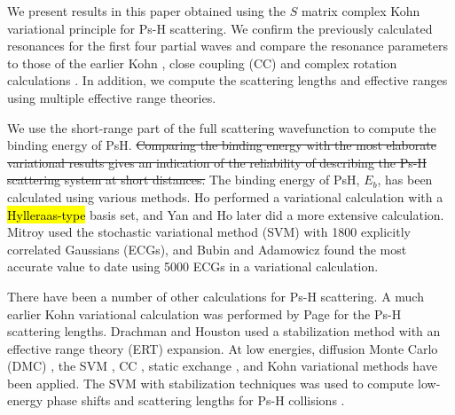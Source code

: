 \documentclass[preprint,showpacs,showkeys,preprintnumbers,amsmath,amssymb,longbibliography,pra,aps]{revtex4-1}
\begin{document}
We present results in this paper obtained using the $S$ matrix complex Kohn 
variational principle for Ps-H scattering. We confirm the previously calculated 
resonances for the first four partial waves and compare the resonance parameters
to those of the earlier Kohn \cite{VanReeth2003,VanReeth2004}, close 
coupling (CC) \cite{Walters2004} and complex rotation calculations
\cite{Yan1999,Yan1998a,Ho1998,Ho2000}. In addition, we compute the scattering
lengths and effective ranges using multiple effective range theories.

We use the short-range part of the full scattering wavefunction to 
compute the binding energy of PsH. \sout{Comparing the binding energy with the most 
elaborate variational results gives an indication of the reliability of 
describing the Ps-H scattering system at short distances.} The binding energy
of PsH, $E_b$, has been calculated using various methods. Ho \cite{Ho1986}
performed a variational calculation with a \hl{Hylleraas-type} basis set, and Yan and Ho
\cite{Yan1999} later did a more extensive calculation. Mitroy \cite{Mitroy2006}
used the stochastic variational method (SVM) with 1800 explicitly correlated 
Gaussians (ECGs), and Bubin and Adamowicz \cite{Bubin2006} found the most 
accurate value to date using 5000 ECGs in a variational calculation.

There have been a number of other calculations for Ps-H scattering. A much 
earlier Kohn variational calculation was performed by Page \cite{Page1976} 
for the Ps-H scattering lengths. Drachman and Houston
\cite{Drachman1975,Drachman1976} used
a stabilization method with an effective range theory (ERT) expansion.
At low energies, diffusion Monte Carlo (DMC)
\cite{Chiesa2002}, the SVM \cite{Ivanov2001,Ivanov2002}, CC
\cite{Sinha1997,Campbell1998,Adhikari1999,Sinha2000,Blackwood2002,Blackwood2002b,Walters2004},
static exchange \cite{Hara1975,Ray1997,*Ray1996}, and Kohn variational
\cite{Page1976,VanReeth2003,VanReeth2004} methods have been applied. The SVM
with stabilization 
techniques was used to compute low-energy phase shifts and 
scattering lengths for Ps-H collisions \cite{Ivanov2001,Ivanov2002}.
\end{document}
